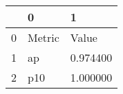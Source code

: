 \begin{tabular}{lll}
\toprule
 & 0 & 1 \\
\midrule
0 & Metric & Value \\
1 & ap & 0.974400 \\
2 & p10 & 1.000000 \\
\bottomrule
\end{tabular}
